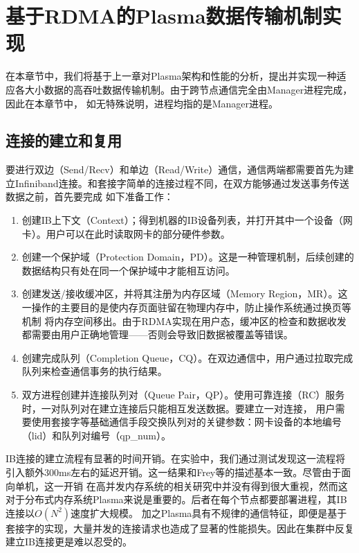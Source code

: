 \chapter{基于RDMA的Plasma数据传输机制实现}
\label{sec:implementation}

在本章节中，我们将基于上一章对Plasma架构和性能的分析，提出并实现一种适应各大小数据的高吞吐数据传输机制。由于跨节点通信完全由Manager进程完成，因此在本章节中，
如无特殊说明，进程均指的是Manager进程。

\section{连接的建立和复用}

要进行双边（Send/Recv）和单边（Read/Write）通信，通信两端都需要首先为建立Infiniband连接。和套接字简单的连接过程不同，在双方能够通过发送事务传送数据之前，首先要完成
如下准备工作：

\begin{enumerate}
	\item 创建IB上下文（Context）；得到机器的IB设备列表，并打开其中一个设备（网卡）。用户可以在此时读取网卡的部分硬件参数。
	\item 创建一个保护域（Protection Domain，PD）。这是一种管理机制，后续创建的数据结构只有处在同一个保护域中才能相互访问。
	\item 创建发送/接收缓冲区，并将其注册为内存区域（Memory Region，MR）。这一操作的主要目的是使内存页面驻留在物理内存中，防止操作系统通过换页等机制
	将内存空间移出。由于RDMA实现在用户态，缓冲区的检查和数据收发都需要由用户正确地管理——否则会导致旧数据被覆盖等错误。
	\item 创建完成队列（Completion Queue，CQ）。在双边通信中，用户通过拉取完成队列来检查通信事务的执行结果。
	\item 双方进程创建并连接队列对（Queue Pair，QP）。使用可靠连接（RC）服务时，一对队列对在建立连接后只能相互发送数据。要建立一对连接，
	用户需要使用套接字等基础通信手段交换队列对的关键参数：网卡设备的本地编号（lid）和队列对编号（qp\_num）。
\end{enumerate}

IB连接的建立流程有显著的时间开销。在实验中，我们通过测试发现这一流程将引入额外300ms左右的延迟开销。这一结果和Frey等\cite{frey2009minimizing}的描述基本一致。尽管由于面向单机，这一开销
在高并发内存系统的相关研究中并没有得到很大重视，然而这对于分布式内存系统Plasma来说是重要的。后者在每个节点都要部署进程，其IB连接以$O(N^2)$速度扩大规模。
加之Plasma具有不规律的通信特征，即便是基于套接字的实现，大量并发的连接请求也造成了显著的性能损失。因此在集群中反复建立IB连接更是难以忍受的。

